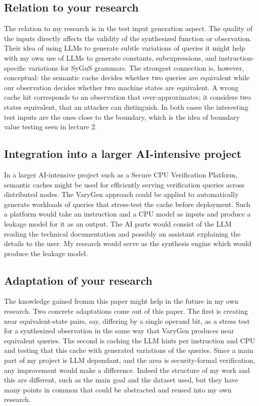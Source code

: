 \documentclass[11pt]{article}
\begin{document}
\subsection{Relation to your research}
The relation to my research is in the test input generation aspect. The quality of the inputs directly affects the validity of the synthesized function or observation. Their idea of using LLMs to generate subtle variations of queries it might help with my own use of LLMs to generate constants, subexpressions, and instruction-specific variations for SyGuS grammars. 
The strongest connection is, however, conceptual: the semantic cache decides whether two queries are equivalent while our observation decides whether two machine states are equivalent. A wrong cache hit corresponds to an observation that over-approximates; it considers two states equivalent, that an attacker can distinguish. In both cases the interesting test inputs are the ones close to the boundary, which is the idea of boundary value testing seen in lecture 2.
\subsection{Integration into a larger AI-intensive project}
In a larger AI-intensive project such as a Secure CPU Verification Platform, semantic caches might be used for efficiently serving verification queries across distributed nodes. The VaryGen approach could be applied to automatically generate workloads of queries that stress-test the cache before deployment. 
Such a platform would take an instruction and a CPU model as inputs and produce a leakage model for it as an output. The AI parts would consist of the LLM reading the technical documentation and possibly an assistant explaining the details to the user. My research would serve as the synthesis engine which would produce the leakage model.
\subsection{Adaptation of your research}
The knowledge gained fromm this paper might help in the future in my own research. Two concrete adaptations come out of this paper. The first is creating near equivalent-state pairs, say, differing by a single operand bit, as a stress test for a synthesized observation in the same way that VaryGen produces near equivalent queries. The second is caching the LLM hints per instruction and CPU and testing that this cache with generated variations of the queries.
Since a main part of my project is LLM dependant, and the area is security-formal verification, any improvement would make a difference. 
Indeed the structure of my work and this are different, such as the main goal and the dataset used, but they have many points in common that could be abstracted and reused into my own research.
\end{document}

